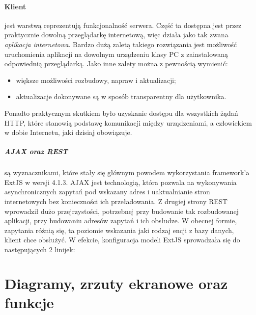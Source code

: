 		\paragraph{Klient} jest warstwą reprezentują funkcjonalność serwera. Część ta dostępna jest przez praktycznie
		dowolną przeglądarkę internetową, więc działa jako tak zwana \emph{aplikacja internetowa}. Bardzo
		dużą zaletą takiego rozwiązania jest możliwość uruchomienia aplikacji na dowolnym urządzeniu klasy PC z zainstalowaną
		odpowiednią przeglądarką. Jako inne zalety można z pewnością wymienić: 
		\begin{itemize}
			\item większe możliwości rozbudowy, napraw i aktualizacji;
			\item aktualizacje dokonywane są w sposób transparentny dla użytkownika.
		\end{itemize}
		Ponadto praktycznym skutkiem było uzyskanie dostępu dla wszystkich żądań HTTP, które stanowią podstawę
		komunikacji między urządzeniami, a człowiekiem w dobie Internetu, jaki dzisiaj obowiązuje.
		\subparagraph{AJAX oraz REST} są wyznacznikami, które stały się głównym powodem wykorzystania
		framework'a ExtJS w wersji 4.1.3. AJAX jest technologią, która pozwala na wykonywania asynchronicznych
		zapytań pod wskazany adres i uaktualnianie stron internetowych bez konieczności ich przeładowania. 
		Z drugiej strony REST wprowadził dużo przejrzystości, potrzebnej przy budowanie tak rozbudowanej aplikacji,
		przy budowaniu adresów zapytań i ich obsłudze. W obecnej formie, zapytania różnią się, ta poziomie
		wskazania jaki rodzaj encji z bazy danych, klient chce obsłużyć. W efekcie, konfiguracja modeli ExtJS
		sprowadzała się do następujących 2 linijek:
\section{Diagramy, zrzuty ekranowe oraz funkcje}
